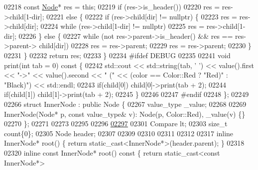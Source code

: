 \begin{DoxyCode}
02218             \textcolor{keyword}{const} \hyperlink{structaed2_1_1map_1_1Node_a9c1a600491066ce7eb669b1cb76d56c6_a9c1a600491066ce7eb669b1cb76d56c6}{Node}* res = \textcolor{keyword}{this};
02219             \textcolor{keywordflow}{if} (res->is\_header())
02220                 res = res->child[1-dir];
02221             \textcolor{keywordflow}{else} \{
02222                 if (res->child[dir] != \textcolor{keyword}{nullptr}) \{
02223                     res = res->child[dir];
02224                     \textcolor{keywordflow}{while} (res->child[1-dir] != \textcolor{keyword}{nullptr})
02225                         res = res->child[1-dir];
02226                 \} \textcolor{keywordflow}{else} \{
02227                     \textcolor{keywordflow}{while} (not res->parent->is\_header() && res == res->parent->
      child[dir])
02228                         res = res->parent;
02229                     res = res->parent;
02230                 \}
02231             \}
02232             \textcolor{keywordflow}{return} res;
02233         \}
02234 \textcolor{preprocessor}{#ifdef DEBUG}
02235 \textcolor{preprocessor}{}
02241         \textcolor{keywordtype}{void} print(\textcolor{keywordtype}{int} tab = 0)\textcolor{keyword}{ const }\{
02242             std::cout << std::string(tab, \textcolor{charliteral}{' '}) << value().first << \textcolor{stringliteral}{"->"} << 
      value().second << \textcolor{stringliteral}{"   ("} << (color == Color::Red ? \textcolor{stringliteral}{"Red)"} : \textcolor{stringliteral}{"Black)"}) << std::endl;
02243             \textcolor{keywordflow}{if}(child[0]) child[0]->print(tab + 2);
02244             \textcolor{keywordflow}{if}(child[1]) child[1]->print(tab + 2);
02245         \}
02246 
02247 \textcolor{preprocessor}{#endif}
02248 \textcolor{preprocessor}{}    \};
02249 
02266     \textcolor{keyword}{struct }InnerNode : \textcolor{keyword}{public} Node \{
02267         value\_type \_value;
02268 
02269         InnerNode(Node* p, \textcolor{keyword}{const} value\_type& v): Node(p, Color::Red), \_value(v)
       \{\}
02270     \};
02271 
02273 
02295 
02296 
\hypertarget{map_8h_source_l02297}{}\hyperlink{classaed2_1_1map_a0e5be36fae0693e4665bd2a615e7550a_a0e5be36fae0693e4665bd2a615e7550a}{02297} 
02301     Compare lt;
02303     \textcolor{keywordtype}{size\_t} count\{0\};
02305     Node header;
02307 
02309 
02310 
02311 
02312 
02317     \textcolor{keyword}{inline} InnerNode* root() \{ \textcolor{keywordflow}{return} \textcolor{keyword}{static\_cast<}InnerNode*\textcolor{keyword}{>}(header.parent); \}
02318 
02320     \textcolor{keyword}{inline} \textcolor{keyword}{const} InnerNode* root()\textcolor{keyword}{ const }\{ \textcolor{keywordflow}{return} \textcolor{keyword}{static\_cast<}\textcolor{keyword}{const }InnerNode*\textcolor{keyword}{>}

\end{DoxyCode}

